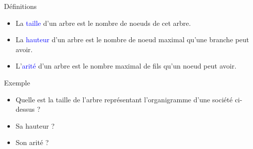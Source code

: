 \documentclass[10pt]{beamer}
\begin{document}
\begin{frame}
	\mframe{\AB}
	\begin{alertblock}{Définitions}
		\begin{itemize}
			\item<1-> La \textcolor{blue}{taille} d'un arbre est le nombre de noeuds de cet arbre. \\
			      \onslide<2->{\begin{small} \textcolor{gray}{L'arbre vide n'a aucun noeud, sa taille est 0.} \end{small}}
			\item<3-> La \textcolor{blue}{hauteur} d'un arbre est le nombre de noeud maximal qu'une branche peut avoir. \\
			      \onslide<4->{\begin{small} \textcolor{gray}{Différentes définitions existent pour la hauteur d'un arbre, on considère parfois que la hauteur est le nombre maximal d'arête que peut avoir une branche.} \end{small}}
			\item<5-> L'\textcolor{blue}{arité} d'un arbre est le nombre maximal de fils qu'un noeud peut avoir. \\
			      \onslide<6->{\begin{small} \textcolor{gray}{On parle aussi de l'arité (ou degré) d'un noeud, il s'agit alors du nombre de fils de ce noeud} \end{small}}
		\end{itemize}
	\end{alertblock}
	\begin{exampleblock}{Exemple}
		\begin{itemize}
			\item<7-> Quelle est la taille de l'arbre représentant l'organigramme d'une société ci-dessus ?
			\item<8-> Sa hauteur ?
			\item<9-> Son arité ?
		\end{itemize}
	\end{exampleblock}
\end{frame}
\end{document}
